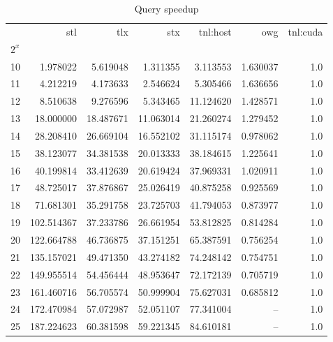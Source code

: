 \begin{table}
  \centering
  \begin{tabular}{lrrrrrr}
    \toprule
    {}    & stl        & tlx       & stx       & tnl:host  & owg      & tnl:cuda \\
    $2^x$ &            &           &           &           &          &          \\
    \midrule
    10    & 1.978022   & 5.619048  & 1.311355  & 3.113553  & 1.630037 & 1.0      \\
    11    & 4.212219   & 4.173633  & 2.546624  & 5.305466  & 1.636656 & 1.0      \\
    12    & 8.510638   & 9.276596  & 5.343465  & 11.124620 & 1.428571 & 1.0      \\
    13    & 18.000000  & 18.487671 & 11.063014 & 21.260274 & 1.279452 & 1.0      \\
    14    & 28.208410  & 26.669104 & 16.552102 & 31.115174 & 0.978062 & 1.0      \\
    15    & 38.123077  & 34.381538 & 20.013333 & 38.184615 & 1.225641 & 1.0      \\
    16    & 40.199814  & 33.412639 & 20.619424 & 37.969331 & 1.020911 & 1.0      \\
    17    & 48.725017  & 37.876867 & 25.026419 & 40.875258 & 0.925569 & 1.0      \\
    18    & 71.681301  & 35.291758 & 23.725703 & 41.794053 & 0.873977 & 1.0      \\
    19    & 102.514367 & 37.233786 & 26.661954 & 53.812825 & 0.814284 & 1.0      \\
    20    & 122.664788 & 46.736875 & 37.151251 & 65.387591 & 0.756254 & 1.0      \\
    21    & 135.157021 & 49.471350 & 43.274182 & 74.248142 & 0.754751 & 1.0      \\
    22    & 149.955514 & 54.456444 & 48.953647 & 72.172139 & 0.705719 & 1.0      \\
    23    & 161.460716 & 56.705574 & 50.999904 & 75.627031 & 0.685812 & 1.0      \\
    24    & 172.470984 & 57.072987 & 52.051107 & 77.341004 & --       & 1.0      \\
    25    & 187.224623 & 60.381598 & 59.221345 & 84.610181 & --       & 1.0      \\
    \bottomrule
  \end{tabular}
  \caption{Query speedup}
  \label{table:query-speedup}
\end{table}